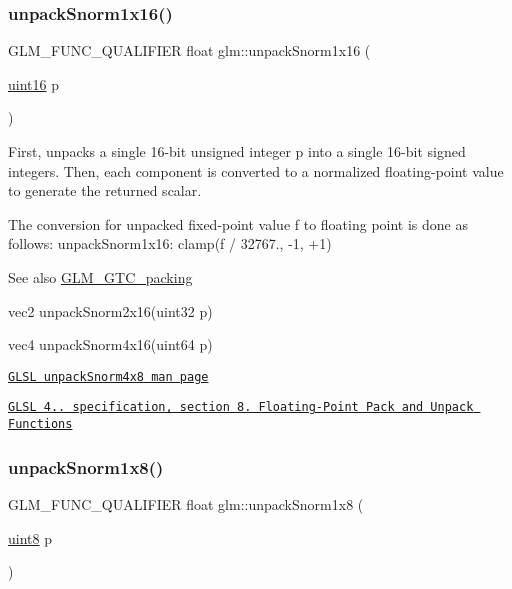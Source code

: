 \subsubsection{\texorpdfstring{unpack\+Snorm1x16()}{unpackSnorm1x16()}}
{\footnotesize\ttfamily G\+L\+M\+\_\+\+F\+U\+N\+C\+\_\+\+Q\+U\+A\+L\+I\+F\+I\+ER float glm\+::unpack\+Snorm1x16 (\begin{DoxyParamCaption}\item[{\hyperlink{group__gtc__type__precision_gad8c2939e1fdd8e5828b31d95c52255d5}{uint16}}]{p }\end{DoxyParamCaption})}

First, unpacks a single 16-\/bit unsigned integer p into a single 16-\/bit signed integers. Then, each component is converted to a normalized floating-\/point value to generate the returned scalar.

The conversion for unpacked fixed-\/point value f to floating point is done as follows\+: unpack\+Snorm1x16\+: clamp(f / 32767., -\/1, +1)

\begin{DoxySeeAlso}{See also}
\hyperlink{group__gtc__packing}{G\+L\+M\+\_\+\+G\+T\+C\+\_\+packing} 

vec2 unpack\+Snorm2x16(uint32 p) 

vec4 unpack\+Snorm4x16(uint64 p) 

\href{http://www.opengl.org/sdk/docs/manglsl/xhtml/unpackSnorm1x16.xml}{\tt G\+L\+SL unpack\+Snorm4x8 man page} 

\href{http://www.opengl.org/registry/doc/GLSLangSpec.4.20.8.pdf}{\tt G\+L\+SL 4.. specification, section 8. Floating-\/\+Point Pack and Unpack Functions} 
\end{DoxySeeAlso}
\mbox{\label{group__gtc__packing_ga6f2bebf536fbf7c8b97d4b306bb3354e}} 
\subsubsection{\texorpdfstring{unpack\+Snorm1x8()}{unpackSnorm1x8()}}
{\footnotesize\ttfamily G\+L\+M\+\_\+\+F\+U\+N\+C\+\_\+\+Q\+U\+A\+L\+I\+F\+I\+ER float glm\+::unpack\+Snorm1x8 (\begin{DoxyParamCaption}\item[{\hyperlink{group__gtc__type__precision_ga1a7dcd8aac97cc8020817c94049deff2}{uint8}}]{p }\end{DoxyParamCaption})}

